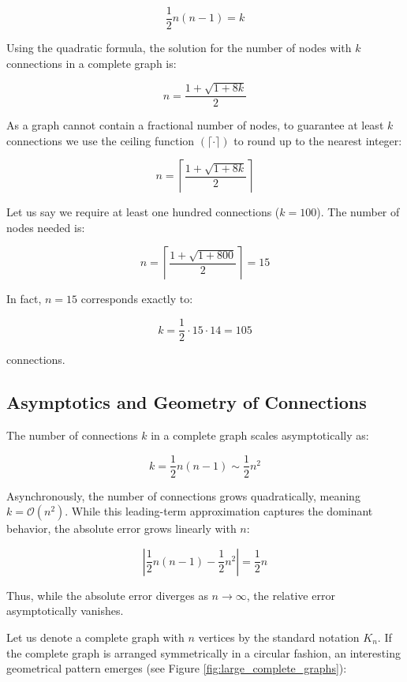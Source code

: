 \documentclass[
  12pt,
  letterpaper,
]{article}
\theoremstyle{plain}
\theoremstyle{definition}
\begin{document}
\[\frac{1}{2}n(n-1) = k\]

Using the quadratic formula, the solution for the number of nodes with
\(k\) connections in a complete graph is:

\[n  = \frac{1+\sqrt{1+8k}}{2}\]

As a graph cannot contain a fractional number of nodes, to guarantee at
least \(k\) connections we use the ceiling function
\((\lceil \cdot \rceil)\) to round up to the nearest integer:

\[n  = \left\lceil \frac{1+\sqrt{1+8k}}{2}\right\rceil\]

Let us say we require at least one hundred connections (\(k=100\)). The
number of nodes needed is:

\[n = \left\lceil \frac{1+\sqrt{1+800}}{2}\right\rceil= 15\]

In fact, \(n=15\) corresponds exactly to:

\[k = \frac{1}{2}\cdot 15\cdot14 = 105\]

connections.

\subsection{Asymptotics and Geometry of
Connections}\label{asymptotics-and-geometry-of-connections}

The number of connections \(k\) in a complete graph scales
asymptotically as:

\[k = \frac{1}{2}n(n-1) \sim \frac{1}{2}n^2\]

Asynchronously, the number of connections grows quadratically, meaning
\(k = \mathcal{O}(n^2)\). While this leading-term approximation captures
the dominant behavior, the absolute error grows linearly with \(n\):

\[\left| \frac{1}{2}n(n-1) - \frac{1}{2}n^2 \right| = \frac{1}{2}n\]

Thus, while the absolute error diverges as \(n \to \infty\), the
relative error asymptotically vanishes.

Let us denote a complete graph with \(n\) vertices by the standard
notation \(K_n\). If the complete graph is arranged symmetrically in a
circular fashion, an interesting geometrical pattern emerges (see Figure
\ref{fig:large_complete_graphs}):
\end{document}
